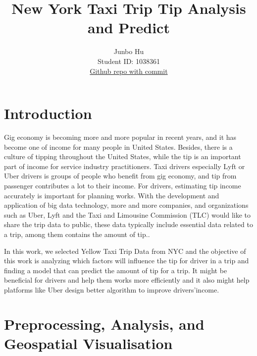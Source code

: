 \documentclass[11pt]{article}
\title{\textbf{New York Taxi Trip Tip Analysis and Predict }}
\author{
Junbo Hu \\
Student ID: 1038361 \\
\href{https://github.com/MAST30034-Applied-Data-Science/mast30034-project-1-jumbo11111}{Github repo with commit}
}
\begin{document}
\maketitle

\section{Introduction}


Gig economy is becoming more and more popular in recent years, and it has become one of income for many people in United States. Besides, there is a culture of tipping throughout the United States, while the tip is an important part of income for service industry practitioners. Taxi drivers especially Lyft or Uber drivers is groups of people who benefit from gig economy, and tip from passenger contributes a lot to their income. For drivers, estimating tip income accurately is important for planning works. With the development and application of big data technology, more and more companies, and organizations such as Uber, Lyft and the Taxi and Limousine Commission (TLC) would like to share the trip data to public, these data typically include essential data related to a trip, among them contains the amount of tip.\cite{ref1}.

In this work, we selected Yellow Taxi Trip Data from NYC and the objective of this work is analyzing which factors will influence the tip for driver in a trip and finding a model that can predict the amount of tip for a trip. It might be beneficial for drivers and help them works more efficiently and it also might help platforms like Uber design better algorithm to improve drivers’income.


\section{Preprocessing, Analysis, and Geospatial Visualisation}
\end{document}
